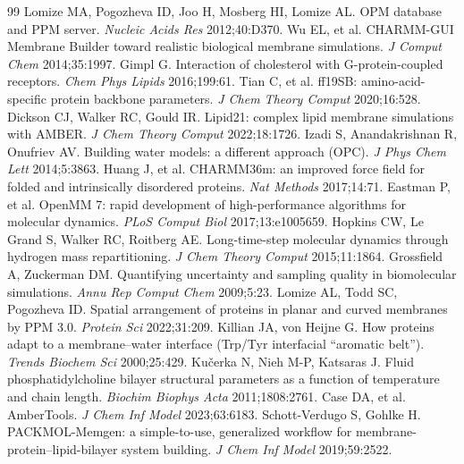 \documentclass[11pt]{article}
\begin{document}
\begin{thebibliography}{99}
 Lomize MA, Pogozheva ID, Joo H, Mosberg HI, Lomize AL. OPM database and PPM server.
  \emph{Nucleic Acids Res} 2012;40:D370.
 Wu EL, et al. CHARMM-GUI Membrane Builder toward realistic biological
  membrane simulations. \emph{J Comput Chem} 2014;35:1997.
 Gimpl G. Interaction of cholesterol with G-protein-coupled receptors.
  \emph{Chem Phys Lipids} 2016;199:61.
 Tian C, et al. ff19SB: amino-acid-specific protein backbone parameters.
  \emph{J Chem Theory Comput} 2020;16:528.
 Dickson CJ, Walker RC, Gould IR. Lipid21: complex lipid membrane simulations with
  AMBER. \emph{J Chem Theory Comput} 2022;18:1726.
 Izadi S, Anandakrishnan R, Onufriev AV. Building water models: a different approach (OPC).
  \emph{J Phys Chem Lett} 2014;5:3863.
 Huang J, et al. CHARMM36m: an improved force field for folded and intrinsically
  disordered proteins. \emph{Nat Methods} 2017;14:71.
 Eastman P, et al. OpenMM 7: rapid development of high-performance algorithms for
  molecular dynamics. \emph{PLoS Comput Biol} 2017;13:e1005659.
 Hopkins CW, Le Grand S, Walker RC, Roitberg AE. Long-time-step molecular dynamics through
  hydrogen mass repartitioning. \emph{J Chem Theory Comput} 2015;11:1864.
 Grossfield A, Zuckerman DM. Quantifying uncertainty and sampling quality in
  biomolecular simulations. \emph{Annu Rep Comput Chem} 2009;5:23.
 Lomize AL, Todd SC, Pogozheva ID. Spatial arrangement of proteins in planar and curved
  membranes by PPM 3.0. \emph{Protein Sci} 2022;31:209.
 Killian JA, von Heijne G. How proteins adapt to a membrane--water interface
  (Trp/Tyr interfacial ``aromatic belt''). \emph{Trends Biochem Sci} 2000;25:429.
 Ku\v{c}erka N, Nieh M-P, Katsaras J. Fluid phosphatidylcholine bilayer structural
  parameters as a function of temperature and chain length. \emph{Biochim Biophys Acta} 2011;1808:2761.
 Case DA, et al. AmberTools. \emph{J Chem Inf Model} 2023;63:6183.
 Schott-Verdugo S, Gohlke H. PACKMOL-Memgen: a simple-to-use, generalized
  workflow for membrane-protein--lipid-bilayer system building. \emph{J Chem Inf Model} 2019;59:2522.
\end{thebibliography}
\end{document}

